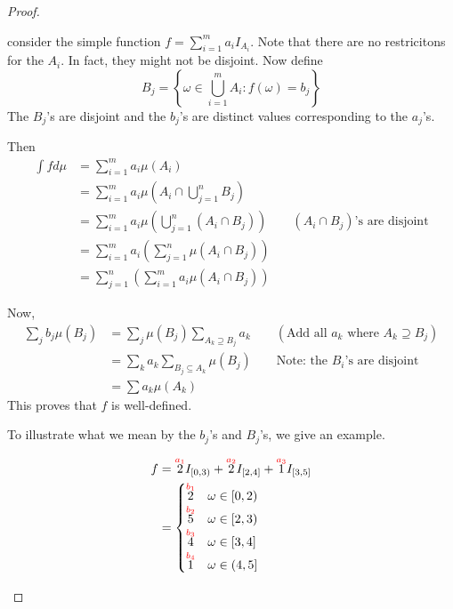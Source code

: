\begin{proof}
\begin{prooflist}
\item consider the simple function $f=\sum_{i=1}^{m}a_iI_{A_i}$. Note that there are no restricitons for the $A_i$. In fact, they might not be disjoint. Now define
\begin{equation*}
B_j=\left\{\omega\in\bigcup_{i=1}^m A_i: f(\omega)=b_j \right\}
\end{equation*}
The $B_j$'s are disjoint and the $b_j$'s are distinct values corresponding to the $a_j$'s. 

Then
\begin{align*}
\int fd\mu &= \sum_{i=1}^{m} a_i\mu(A_i)\\
&=\sum_{i=1}^{m} a_i\mu\left(A_i\cap \bigcup_{j=1}^n B_j\right)\\
&=\sum_{i=1}^{m} a_i\mu\left(\bigcup_{j=1}^n(A_i\cap B_j)\right)\qquad \text{$(A_i\cap B_j)$'s are disjoint}\\
&=\sum_{i=1}^{m}a_i\left(\sum_{j=1}^{n} \mu(A_i\cap B_j)\right)\\
&=\sum_{j=1}^{n}\left(\sum_{i=1}^{m}a_i\mu(A_i\cap B_j)\right)
\end{align*}


Now,
\begin{align}
\sum_j b_j\mu(B_j)&=\sum_j\mu(B_j)\sum_{A_k\supseteq B_j} a_k\qquad (\text{Add all $a_k$ where $A_k\supseteq B_j$})\label{eq:illus1}\\
	&=\sum_k a_k\sum_{B_j\subseteq A_k} \mu(B_j)\qquad \text{Note: the $B_i$'s are disjoint}\label{eq:illus3}\\
	&=\sum a_k \mu(A_k)\label{eq:illus2}
\end{align}
This proves that $f$ is well-defined.

To illustrate what we mean by the $b_j$'s and $B_j$'s, we give an example.

\begin{example}
	\begin{align*}
	f&=\overset{\textcolor{red}{a_1}}{2}I_{[0,3)}+\overset{\textcolor{red}{a_2}}{2}I_{[2,4]}+\overset{\textcolor{red}{a_3}}{1}I_{[3,5]}\\
	&=
	\begin{cases}
	\overset{\textcolor{red}{b_1}}{2}& \omega\in[0,2)\\
	\overset{\textcolor{red}{b_2}}{5}& \omega\in[2,3)\\
	\overset{\textcolor{red}{b_3}}{4}& \omega\in[3,4]\\
	\overset{\textcolor{red}{b_4}}{1}& \omega\in(4,5]
	\end{cases}
	\end{align*}
	

\end{example}
\end{prooflist}
\end{proof}
